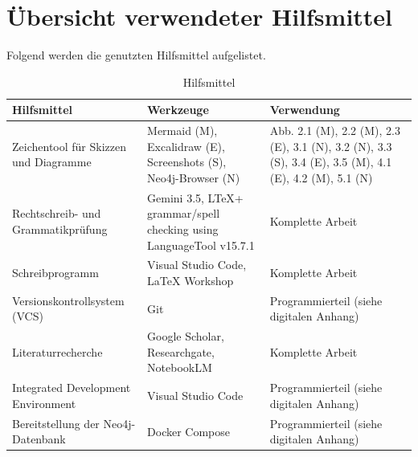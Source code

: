 \section{Übersicht verwendeter Hilfsmittel}
Folgend werden die genutzten Hilfsmittel aufgelistet.
\begin{table}[H]
  \centering
  \small
  \renewcommand{\arraystretch}{1.1}
  \setlength{\tabcolsep}{8pt}
  \caption{Hilfsmittel}
  \label{tab:hilfsmittel}
  \begin{tabularx}{\textwidth}{LLL}
    \toprule
    \textbf{Hilfsmittel}                                        & \textbf{Werkzeuge}                                                   & \textbf{Verwendung}                                                                                    \\
    \midrule
    Zeichentool für Skizzen und Diagramme                       & Mermaid (M), Excalidraw (E), Screenshots (S), Neo4j-Browser (N)      & Abb. 2.1 (M), 2.2 (M), 2.3 (E), 3.1 (N), 3.2 (N), 3.3 (S), 3.4 (E), 3.5 (M), 4.1 (E), 4.2 (M), 5.1 (N) \\ \hline
    Rechtschreib- und Grammatikprüfung                          & Gemini 3.5, LTeX+ grammar/spell checking using LanguageTool  v15.7.1 & Komplette Arbeit                                                                                       \\ \hline
    Schreibprogramm                                             & Visual Studio Code, LaTeX Workshop                                   & Komplette Arbeit                                                                                       \\ \hline
    Versionskontrollsystem (VCS)                                & Git                                                                  & Programmierteil (siehe digitalen Anhang)                                                               \\ \hline
    Literaturrecherche                                          & Google Scholar, Researchgate, NotebookLM                             & Komplette Arbeit                                                                                       \\ \hline
    Integrated Development Environment                          & Visual Studio Code                                                   & Programmierteil (siehe digitalen Anhang)                                                               \\ \hline
    Bereitstellung der Neo4j-Datenbank                          & Docker Compose                                                       & Programmierteil (siehe digitalen Anhang)                                                               \\ \hline

\end{tabularx}
\end{table}

